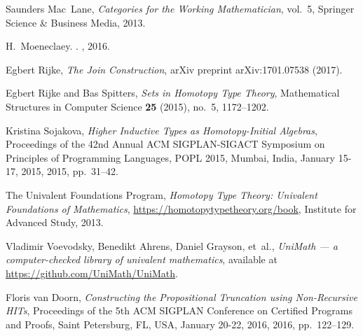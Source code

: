 \documentclass[9pt]{entcs}
\newcommand{\0}{\textbf{0}} %
\begin{document}
\begin{thebibliography}{10}
	Saunders Mac~Lane, \emph{{Categories for the Working Mathematician}}, vol.~5,
	Springer Science \& Business Media, 2013.
	
	H.~Moeneclaey.
	.
	, 2016.
	
	Egbert Rijke, \emph{{The Join Construction}}, arXiv preprint arXiv:1701.07538
	(2017).
	
	Egbert Rijke and Bas Spitters, \emph{{Sets in Homotopy Type Theory}},
	Mathematical Structures in Computer Science \textbf{25} (2015), no.~5,
	1172--1202.
	
	Kristina Sojakova, \emph{{Higher Inductive Types as Homotopy-Initial
			Algebras}}, Proceedings of the 42nd Annual {ACM} {SIGPLAN-SIGACT} Symposium
	on Principles of Programming Languages, {POPL} 2015, Mumbai, India, January
	15-17, 2015, 2015, pp.~31--42.
	
	{The Univalent Foundations Program}, \emph{{Homotopy Type Theory: Univalent
			Foundations of Mathematics}}, \url{https://homotopytypetheory.org/book},
	Institute for Advanced Study, 2013.
	
	Vladimir Voevodsky, Benedikt Ahrens, Daniel Grayson, et~al., \emph{{UniMath ---
			a computer-checked library of univalent mathematics}}, {available} at
	\url{https://github.com/UniMath/UniMath}.
	
	Floris van Doorn, \emph{{Constructing the Propositional Truncation using
			Non-Recursive HITs}}, Proceedings of the 5th {ACM} {SIGPLAN} Conference on
	Certified Programs and Proofs, Saint Petersburg, FL, USA, January 20-22,
	2016, 2016, pp.~122--129.	
\end{thebibliography}
\end{document}
